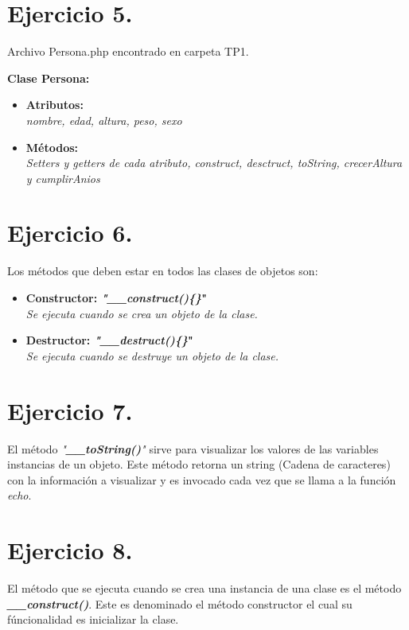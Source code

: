 \documentclass{article}
\begin{document}
\section*{Ejercicio 5.}

\indent Archivo Persona.php encontrado en carpeta TP1. \par

\indent \textbf{Clase Persona:}
\begin{itemize}
    \item \textbf{Atributos:}\\
          \textit{nombre, edad, altura, peso, sexo}
    \item \textbf{Métodos:}\\
          \textit{Setters y getters de cada atributo, construct, desctruct, toString, crecerAltura y cumplirAnios}
\end{itemize}

\section*{Ejercicio 6.}

Los métodos que deben estar en todos las clases de objetos son:
\begin{itemize}
    \item \textbf{Constructor: \textit{"\_\_construct()\{\}}"}\\\textit{Se ejecuta cuando se crea un objeto de la clase.}
    \item \textbf{Destructor: \textit{"\_\_destruct()\{\}}"}\\\textit{Se ejecuta cuando se destruye un objeto de la clase.}
\end{itemize}

\section*{Ejercicio 7.}

\indent El método \textit{"\textbf{\_\_toString()}"} sirve para visualizar los valores
de las variables instancias de un objeto. Este método retorna un string
(Cadena de caracteres) con la información a visualizar y es invocado cada
vez que se llama a la función \textit{echo}.

\section*{Ejercicio 8.}

\indent El método que se ejecuta cuando se crea una instancia de una clase es el
método \textit{\textbf{\_\_construct()}}. Este es denominado el método constructor
el cual su fúncionalidad es inicializar la clase.
\end{document}
